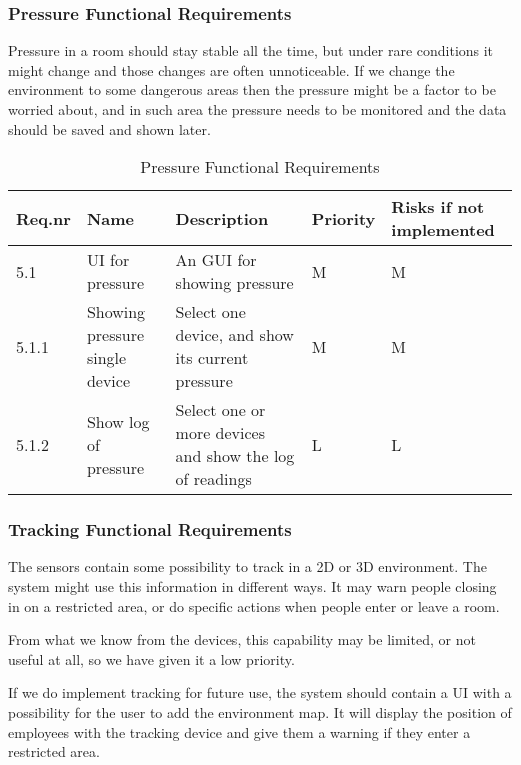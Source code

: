 \documentclass[../document]{subfiles}
\begin{document}
\subsubsection{Pressure Functional Requirements}
Pressure in a room should stay stable all the time, but under rare conditions it might change and those changes are often unnoticeable. If we change the environment to some dangerous areas then the pressure might be a factor to be worried about, and in such area the pressure needs to be monitored and the data should be saved and shown later.

\begin{table}[H]
\caption{Pressure Functional Requirements}
\centering
\begin{tabularx}{\textwidth}{|l|X|X|l|X|}
	\hline
	Req.nr
	&Name
	&Description
	&Priority
	&Risks if not implemented
	\\ \hline 5.1
	&UI for pressure
	&An GUI for showing pressure
	&M
	&M
	\\ \hline 5.1.1
	&Showing pressure single device
	&Select one device, and show its current pressure
	&M
	&M
	\\ \hline 5.1.2
	&Show log of pressure
	&Select one or more devices and show the log of readings
	&L
	&L
	\\ \hline 
\end{tabularx}
\end{table}

\subsubsection{Tracking Functional Requirements}
The sensors contain some possibility to track in a 2D or 3D environment. The system might use this information in different ways. It may warn people closing in on a restricted area, or do specific actions when people enter or leave a room.

From what we know from the devices, this capability may be limited, or not useful at all, so we have given it a low priority.

If we do implement tracking for future use, the system should contain a UI with a possibility for the user to add the environment map. It will display the position of employees with the tracking device and give them a warning if they enter a restricted area.
\end{document}
